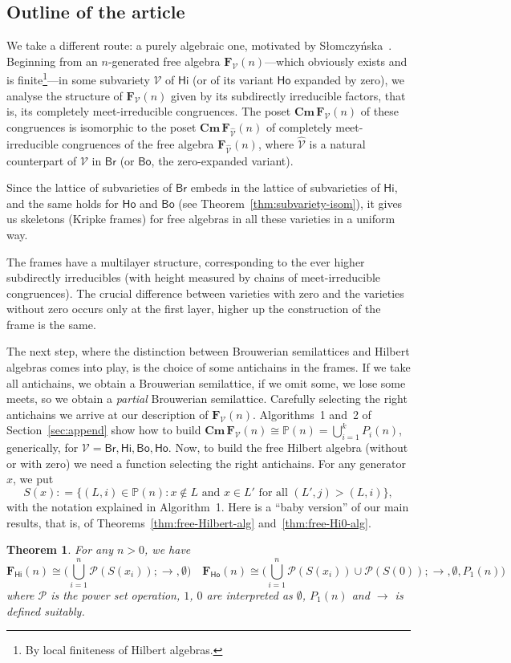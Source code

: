 \documentclass{amsart}
\newtheorem{theorem}{Theorem}[section]
\newcommand{\deq}{\mathrel{\mathop:}=}
\newcommand{\alg}[1]{\mathbf{#1}}
\newcommand{\var}[1]{\mathsf{#1}}
\newcommand{\FV}{\alg{F}_\mathcal{V}}
\newcommand{\FVhat}{\alg{F}_{\widehat{\mathcal{V}}}}
\newcommand{\Cm}[1]{\mathbf{Cm}\, #1}
\def\ra{\rightarrow}
\def\pw{\mathscr{P}}
\begin{document}
\subsection{Outline of the article}
We take a different route: a purely algebraic one, motivated by
Słomczyńska~\cite{Slo08}. Beginning from
an $n$-generated free algebra $\FV(n)$---which obviously exists and is
finite\footnote{By local finiteness of Hilbert algebras.}---in some subvariety
$\mathcal{V}$ of $\mathsf{Hi}$ 
(or of its variant $\mathsf{Ho}$ expanded by zero),
we analyse the structure of $\FV(n)$ given by its subdirectly
irreducible factors, that is, its completely meet-irreducible congruences.
The poset $\Cm{\FV(n)}$ of these congruences is isomorphic
to the poset $\Cm{\FVhat(n)}$ of completely meet-irreducible congruences
of the free algebra $\FVhat(n)$, where $\widehat{\mathcal{V}}$ is a natural
counterpart of $\mathcal{V}$ in $\var{Br}$ (or $\var{Bo}$, the zero-expanded variant).

Since the lattice of subvarieties of  $\var{Br}$ embeds in the lattice of
subvarieties of $\var{Hi}$, and the same holds for
$\var{Ho}$ and $\var{Bo}$ (see Theorem~\ref{thm:subvariety-isom}), it gives us
skeletons  (Kripke frames) for free algebras in all these varieties in a uniform way.

The frames have a multilayer structure, corresponding to the ever higher
subdirectly irreducibles (with height measured by chains of meet-irreducible
congruences). The crucial difference between varieties with zero 
and the varieties without zero occurs only at the first layer, higher up the
construction of the frame is the same. 

The next step, where the distinction between Brouwerian semilattices and Hilbert
algebras comes into play, is the choice of some antichains in the frames.
If we take all antichains, we obtain a Brouwerian semilattice, if we omit some,
we lose some meets, so we obtain a \emph{partial} Brouwerian
semilattice. Carefully selecting the right antichains we arrive at our
description of $\FV(n)$. Algorithms~1 and~2 of Section~\ref{sec:append}
show how to build
$\Cm{\FV}(n)\cong\mathbb{P}(n) = \bigcup_{i=1}^kP_i(n)$, generically, for
$\mathcal{V} = \var{Br}, \var{Hi}, \var{Bo}, \var{Ho}$.
Now, to build the free Hilbert algebra (without or with zero)
we need a function selecting the right antichains. For any generator $x$, we put 
$$
S(x) \deq \big\{(L,i)\in\mathbb{P}(n):
x\notin L \text{ and } x\in L'\text{ for all } (L',j)>(L,i)\big\},
$$
with the notation explained in Algorithm~1. Here is
a ``baby version'' of our main results, that is, of
Theorems~\ref{thm:free-Hilbert-alg} and~\ref{thm:free-Hi0-alg}.
\begin{theorem}\label{thm:baby-version}
For any $n > 0$, we have
$$
\alg{F}_{\var{Hi}}(n)\cong \biggl(\bigcup_{i=1}^n\pw(S(x_i));\ra,\emptyset\biggr)
\quad
\alg{F}_{\var{Ho}}(n)\cong
\biggl(\bigcup_{i=1}^{n}\pw(S(x_i))\cup \pw(S(0));\ra,\emptyset,P_1(n)\biggr)
$$
where $\pw$ is the power set operation, $1$, $0$ are interpreted as $\emptyset$,
$P_1(n)$ and $\ra$ is defined suitably.
\end{theorem}
\end{document}
